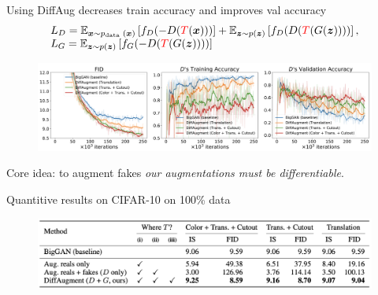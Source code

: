 \documentclass[handout, 10pt]{beamer}
\begin{document}
\begin{frame}{Using DiffAug decreases train accuracy and improves val accuracy}
\begin{equation}
\begin{array}{l}
L_{D}=\mathbb{E}_{\boldsymbol{x} \sim p_{\text {data }}(\boldsymbol{x})}\left[f_{D}(-D(\textcolor{red}{T}(\boldsymbol{x})))\right]+\mathbb{E}_{\boldsymbol{z} \sim p(\boldsymbol{z})}\left[f_{D}(D(\textcolor{red}{T}(G(\boldsymbol{z}))))\right], \\
L_{G}=\mathbb{E}_{\boldsymbol{z} \sim p(\boldsymbol{z})}\left[f_{G}(-D(\textcolor{red}{T}(G(\boldsymbol{z}))))\right]
\end{array}
\end{equation}

\begin{figure}
\centering
\includegraphics[width=\textwidth]{images/diffaug-different-types}
\end{figure}
Core idea: to augment fakes \textit{our augmentations must be differentiable}.
\end{frame}


\begin{frame}{Quantitive results on CIFAR-10 on 100\% data}
\begin{figure}
\centering
\includegraphics[width=\textwidth]{images/cifar10-comparison-table}
\end{figure}
\end{frame}
\end{document}
